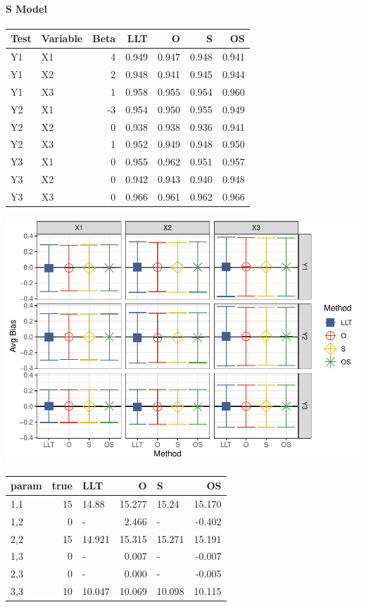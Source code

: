 \documentclass[
]{article}
\begin{document}
\hypertarget{s-model-1}{%
\paragraph{S Model}\label{s-model-1}}

\begin{longtable}[t]{l|l|r|r|r|r|r}
\hline
Test & Variable & Beta & LLT & O & S & OS\\
\hline
Y1 & X1 & 4 & 0.949 & 0.947 & 0.948 & 0.941\\
\hline
Y1 & X2 & 2 & 0.948 & 0.941 & 0.945 & 0.944\\
\hline
Y1 & X3 & 1 & 0.958 & 0.955 & 0.954 & 0.960\\
\hline
Y2 & X1 & -3 & 0.954 & 0.950 & 0.955 & 0.949\\
\hline
Y2 & X2 & 0 & 0.938 & 0.938 & 0.936 & 0.941\\
\hline
Y2 & X3 & 1 & 0.952 & 0.949 & 0.948 & 0.950\\
\hline
Y3 & X1 & 0 & 0.955 & 0.962 & 0.951 & 0.957\\
\hline
Y3 & X2 & 0 & 0.942 & 0.943 & 0.940 & 0.948\\
\hline
Y3 & X3 & 0 & 0.966 & 0.961 & 0.962 & 0.966\\
\hline
\end{longtable}

\includegraphics{FullSimulation_files/figure-latex/unnamed-chunk-17-1.pdf}

\begin{longtable}[t]{l|r|l|r|l|r}
\hline
param & true & LLT & O & S & OS\\
\hline
1,1 & 15 & 14.88 & 15.277 & 15.24 & 15.170\\
\hline
1,2 & 0 & - & 2.466 & - & -0.402\\
\hline
2,2 & 15 & 14.921 & 15.315 & 15.271 & 15.191\\
\hline
1,3 & 0 & - & 0.007 & - & -0.007\\
\hline
2,3 & 0 & - & 0.000 & - & -0.005\\
\hline
3,3 & 10 & 10.047 & 10.069 & 10.098 & 10.115\\
\hline
\end{longtable}
\end{document}
